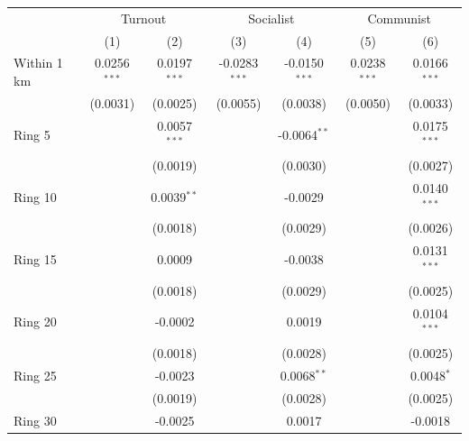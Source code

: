 
\begingroup
\centering
\begin{tabular}{lcccccc}
   \toprule
    & \multicolumn{2}{c}{Turnout} & \multicolumn{2}{c}{Socialist} & \multicolumn{2}{c}{Communist} \\ 
                              & (1)            & (2)            & (3)             & (4)             & (5)            & (6)\\  
   \midrule 
   Within 1 km                & 0.0256$^{***}$ & 0.0197$^{***}$ & -0.0283$^{***}$ & -0.0150$^{***}$ & 0.0238$^{***}$ & 0.0166$^{***}$\\   
                              & (0.0031)       & (0.0025)       & (0.0055)        & (0.0038)        & (0.0050)       & (0.0033)\\   
   Ring 5                     &                & 0.0057$^{***}$ &                 & -0.0064$^{**}$  &                & 0.0175$^{***}$\\   
                              &                & (0.0019)       &                 & (0.0030)        &                & (0.0027)\\   
   Ring 10                    &                & 0.0039$^{**}$  &                 & -0.0029         &                & 0.0140$^{***}$\\   
                              &                & (0.0018)       &                 & (0.0029)        &                & (0.0026)\\   
   Ring 15                    &                & 0.0009         &                 & -0.0038         &                & 0.0131$^{***}$\\   
                              &                & (0.0018)       &                 & (0.0029)        &                & (0.0025)\\   
   Ring 20                    &                & -0.0002        &                 & 0.0019          &                & 0.0104$^{***}$\\   
                              &                & (0.0018)       &                 & (0.0028)        &                & (0.0025)\\   
   Ring 25                    &                & -0.0023        &                 & 0.0068$^{**}$   &                & 0.0048$^{*}$\\   
                              &                & (0.0019)       &                 & (0.0028)        &                & (0.0025)\\   
   Ring 30                    &                & -0.0025        &                 & 0.0017          &                & -0.0018\\   

\end{tabular}
